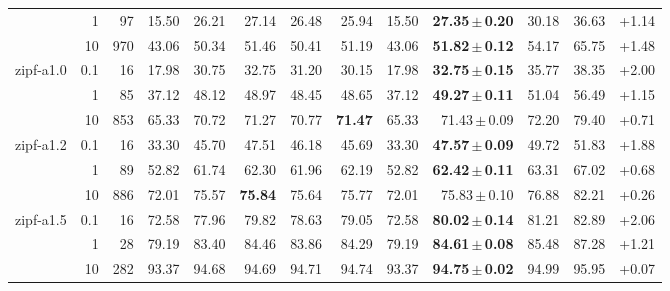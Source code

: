 \begin{tabular}{lrrrrrrrrrrrr}
 & 1 & 97 & 15.50 & 26.21 & 27.14 & 26.48 & 25.94 & 15.50 & \textbf{27.35\,$\pm$\,0.20} & 30.18 & 36.63 & +1.14 \\
 & 10 & 970 & 43.06 & 50.34 & 51.46 & 50.41 & 51.19 & 43.06 & \textbf{51.82\,$\pm$\,0.12} & 54.17 & 65.75 & +1.48 \\
\midrule
zipf-a1.0 & 0.1 & 16 & 17.98 & 30.75 & 32.75 & 31.20 & 30.15 & 17.98 & \textbf{32.75\,$\pm$\,0.15} & 35.77 & 38.35 & +2.00 \\
 & 1 & 85 & 37.12 & 48.12 & 48.97 & 48.45 & 48.65 & 37.12 & \textbf{49.27\,$\pm$\,0.11} & 51.04 & 56.49 & +1.15 \\
 & 10 & 853 & 65.33 & 70.72 & 71.27 & 70.77 & \textbf{71.47} & 65.33 & 71.43\,$\pm$\,0.09 & 72.20 & 79.40 & +0.71 \\
\midrule
zipf-a1.2 & 0.1 & 16 & 33.30 & 45.70 & 47.51 & 46.18 & 45.69 & 33.30 & \textbf{47.57\,$\pm$\,0.09} & 49.72 & 51.83 & +1.88 \\
 & 1 & 89 & 52.82 & 61.74 & 62.30 & 61.96 & 62.19 & 52.82 & \textbf{62.42\,$\pm$\,0.11} & 63.31 & 67.02 & +0.68 \\
 & 10 & 886 & 72.01 & 75.57 & \textbf{75.84} & 75.64 & 75.77 & 72.01 & 75.83\,$\pm$\,0.10 & 76.88 & 82.21 & +0.26 \\
\midrule
zipf-a1.5 & 0.1 & 16 & 72.58 & 77.96 & 79.82 & 78.63 & 79.05 & 72.58 & \textbf{80.02\,$\pm$\,0.14} & 81.21 & 82.89 & +2.06 \\
 & 1 & 28 & 79.19 & 83.40 & 84.46 & 83.86 & 84.29 & 79.19 & \textbf{84.61\,$\pm$\,0.08} & 85.48 & 87.28 & +1.21 \\
 & 10 & 282 & 93.37 & 94.68 & 94.69 & 94.71 & 94.74 & 93.37 & \textbf{94.75\,$\pm$\,0.02} & 94.99 & 95.95 & +0.07 \\
\bottomrule
\end{tabular}
